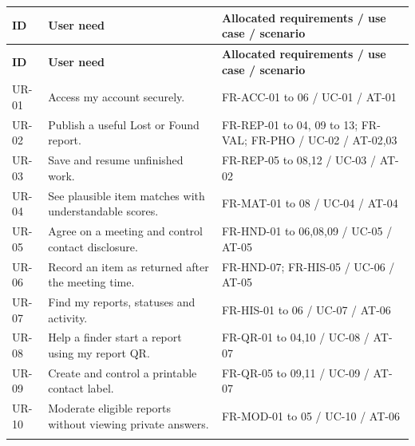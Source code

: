 \documentclass[12pt,a4paper,oneside]{report}
\begin{document}
\begin{longtable}{@{}P{0.12\dimexpr\textwidth-24pt\relax}P{0.38\dimexpr\textwidth-24pt\relax}P{0.5\dimexpr\textwidth-24pt\relax}@{}}

\toprule \textbf{ID} & \textbf{User need} & \textbf{Allocated requirements / use case / scenario} \\ \midrule\endfirsthead

\toprule \textbf{ID} & \textbf{User need} & \textbf{Allocated requirements / use case / scenario} \\ \midrule\endhead

\bottomrule\endfoot

UR-01 & Access my account securely. & FR-ACC-01 to 06 / UC-01 / AT-01 \\ \addlinespace[3pt]

UR-02 & Publish a useful Lost or Found report. & FR-REP-01 to 04, 09 to 13; FR-VAL; FR-PHO / UC-02 / AT-02,03 \\ \addlinespace[3pt]

UR-03 & Save and resume unfinished work. & FR-REP-05 to 08,12 / UC-03 / AT-02 \\ \addlinespace[3pt]

UR-04 & See plausible item matches with understandable scores. & FR-MAT-01 to 08 / UC-04 / AT-04 \\ \addlinespace[3pt]

UR-05 & Agree on a meeting and control contact disclosure. & FR-HND-01 to 06,08,09 / UC-05 / AT-05 \\ \addlinespace[3pt]

UR-06 & Record an item as returned after the meeting time. & FR-HND-07; FR-HIS-05 / UC-06 / AT-05 \\ \addlinespace[3pt]

UR-07 & Find my reports, statuses and activity. & FR-HIS-01 to 06 / UC-07 / AT-06 \\ \addlinespace[3pt]

UR-08 & Help a finder start a report using my report QR. & FR-QR-01 to 04,10 / UC-08 / AT-07 \\ \addlinespace[3pt]

UR-09 & Create and control a printable contact label. & FR-QR-05 to 09,11 / UC-09 / AT-07 \\ \addlinespace[3pt]

UR-10 & Moderate eligible reports without viewing private answers. & FR-MOD-01 to 05 / UC-10 / AT-06 \\ \addlinespace[3pt]

\end{longtable}
\end{document}
